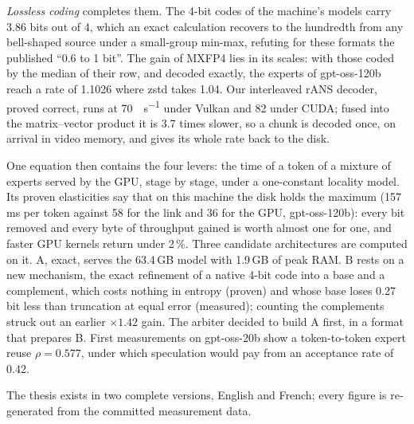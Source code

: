 {\begin{otherlanguage}{english}
\emph{Lossless coding} completes them. The 4-bit codes of the machine's models carry 3.86 bits out of 4, which an exact calculation recovers to the hundredth from any bell-shaped source under a small-group min-max, refuting for these formats the published ``0.6 to 1 bit''. The gain of MXFP4 lies in its scales: with those coded by the median of their row, and decoded exactly, the experts of gpt-oss-120b reach a rate of 1.1026 where zstd takes 1.04. Our interleaved rANS decoder, proved correct, runs at \SI{70}{\Go\per\second} under Vulkan and 82 under CUDA; fused into the matrix--vector product it is 3.7 times slower, so a chunk is decoded once, on arrival in video memory, and gives its whole rate back to the disk.

One equation then contains the four levers: the time of a token of a mixture of experts served by the GPU, stage by stage, under a one-constant locality model. Its proven elasticities say that on this machine the disk holds the maximum (157\,ms per token against 58 for the link and 36 for the GPU, gpt-oss-120b): every bit removed and every byte of throughput gained is worth almost one for one, and faster GPU kernels return under 2\,\%. Three candidate architectures are computed on it. A, exact, serves the 63.4\,GB model with 1.9\,GB of peak RAM. B rests on a new mechanism, the exact refinement of a native 4-bit code into a base and a complement, which costs nothing in entropy (proven) and whose base loses 0.27 bit less than truncation at equal error (measured); counting the complements struck out an earlier $\times 1.42$ gain. The arbiter decided to build A first, in a format that prepares B. First measurements on gpt-oss-20b show a token-to-token expert reuse $\rho = 0.577$, under which speculation would pay from an acceptance rate of 0.42.

The thesis exists in two complete versions, English and French; every figure is regenerated from the committed measurement data.
\end{otherlanguage}
}
